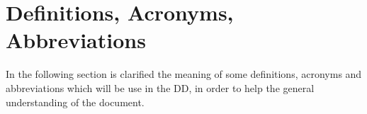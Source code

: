 \section{Definitions, Acronyms, Abbreviations}

In the following section is clarified the meaning of some definitions, acronyms and abbreviations which will be use in the DD, in order to help the general understanding of the document.



